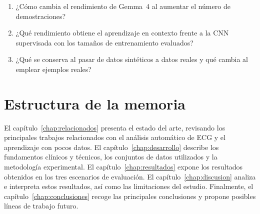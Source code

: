 \begin{enumerate}
  \item ¿Cómo cambia el rendimiento de Gemma~4 al aumentar el número de demostraciones?
  \item ¿Qué rendimiento obtiene el aprendizaje en contexto frente a la CNN supervisada con los tamaños de entrenamiento evaluados?
  \item ¿Qué se conserva al pasar de datos sintéticos a datos reales y qué cambia al emplear ejemplos reales?
\end{enumerate}



\clearpage
\section{Estructura de la memoria}

El capítulo~\ref{chap:relacionados} presenta el estado del arte, revisando los principales trabajos relacionados con el análisis automático de ECG y el aprendizaje con pocos datos. El capítulo~\ref{chap:desarrollo} describe los fundamentos clínicos y técnicos, los conjuntos de datos utilizados y la metodología experimental. El capítulo~\ref{chap:resultados} expone los resultados obtenidos en los tres escenarios de evaluación. El capítulo~\ref{chap:discusion} analiza e interpreta estos resultados, así como las limitaciones del estudio. Finalmente, el capítulo~\ref{chap:conclusiones} recoge las principales conclusiones y propone posibles líneas de trabajo futuro.

\endgroup
